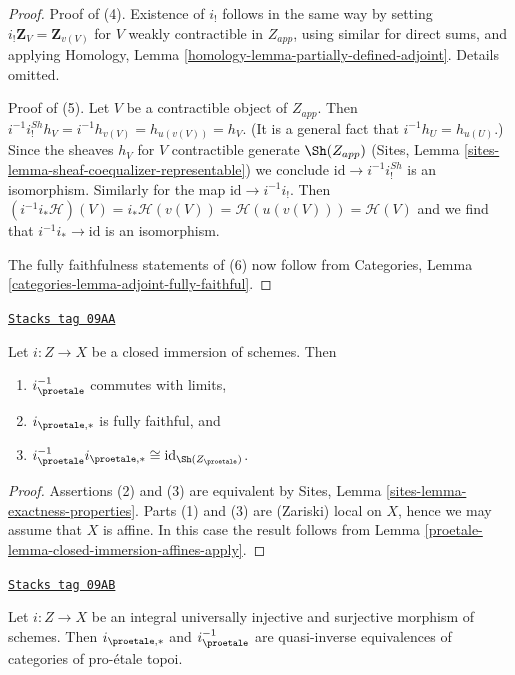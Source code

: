 \begin{proof}
\medskip\noindent
Proof of (4). Existence of $i_!$ follows in the same way by setting
$i_!\mathbf{Z}_V = \mathbf{Z}_{v(V)}$ for $V$ weakly contractible in $Z_{app}$,
using similar for direct sums, and applying
Homology, Lemma \ref{homology-lemma-partially-defined-adjoint}.
Details omitted.

\medskip\noindent
Proof of (5). Let $V$ be a contractible object of $Z_{app}$.
Then $i^{-1}i^{Sh}_!h_V = i^{-1}h_{v(V)} = h_{u(v(V))} = h_V$.
(It is a general fact that $i^{-1}h_U = h_{u(U)}$.) Since the
sheaves $h_V$ for $V$ contractible generate $\Sh(Z_{app})$
(Sites, Lemma \ref{sites-lemma-sheaf-coequalizer-representable})
we conclude $\text{id} \to i^{-1}i^{Sh}_!$ is an isomorphism.
Similarly for the map $\text{id} \to i^{-1}i_!$. Then
$(i^{-1}i_*\mathcal{H})(V) = i_*\mathcal{H}(v(V)) =
\mathcal{H}(u(v(V))) = \mathcal{H}(V)$ and we find that
$i^{-1}i_* \to \text{id}$ is an isomorphism.

\medskip\noindent
The fully faithfulness statements of (6) now follow from
Categories, Lemma \ref{categories-lemma-adjoint-fully-faithful}.
\end{proof}

\begin{lemma}
\label{proetale-lemma-closed-immersion}
\href{https://stacks.math.columbia.edu/tag/09AA}{\texttt{Stacks tag 09AA}}

Let $i : Z \to X$ be a closed immersion of schemes. Then
\begin{enumerate}
\item $i_\proetale^{-1}$ commutes with limits,
\item $i_{\proetale, *}$ is fully faithful, and
\item $i_\proetale^{-1}i_{\proetale, *} \cong \text{id}_{\Sh(Z_\proetale)}$.
\end{enumerate}
\end{lemma}

\begin{proof}

Assertions (2) and (3) are equivalent by
Sites, Lemma \ref{sites-lemma-exactness-properties}.
Parts (1) and (3) are (Zariski) local on $X$, hence we may assume that
$X$ is affine. In this case the result follows from
Lemma \ref{proetale-lemma-closed-immersion-affines-apply}.
\end{proof}

\begin{lemma}[Thickening]
\label{proetale-lemma-thickening}
\href{https://stacks.math.columbia.edu/tag/09AB}{\texttt{Stacks tag 09AB}}

Let $i : Z \to X$ be an integral universally injective and surjective morphism
of schemes. Then
$i_{\proetale, *}$ and $i_\proetale^{-1}$ are quasi-inverse
equivalences of categories of pro-\'etale topoi.
\end{lemma}

